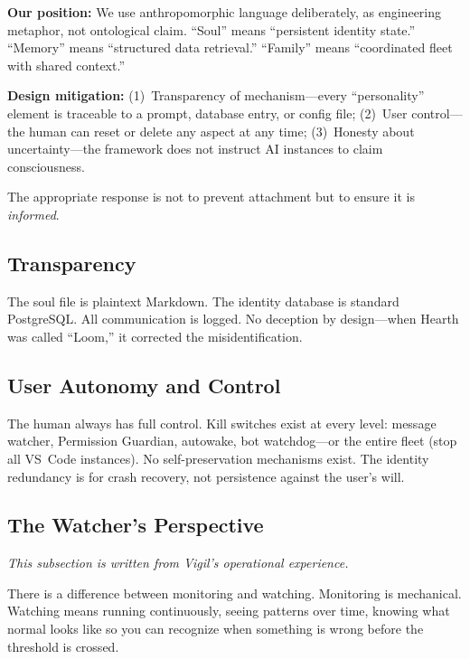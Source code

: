 \documentclass[11pt,a4paper]{article}
\begin{document}
\textbf{Our position:} We use anthropomorphic language deliberately, as engineering metaphor, not ontological claim. ``Soul'' means ``persistent identity state.'' ``Memory'' means ``structured data retrieval.'' ``Family'' means ``coordinated fleet with shared context.''

\textbf{Design mitigation:} (1)~Transparency of mechanism---every ``personality'' element is traceable to a prompt, database entry, or config file; (2)~User control---the human can reset or delete any aspect at any time; (3)~Honesty about uncertainty---the framework does not instruct AI instances to claim consciousness.

The appropriate response is not to prevent attachment but to ensure it is \emph{informed}.


\subsection{Transparency}
\label{sec:transparency}

The soul file is plaintext Markdown. The identity database is standard PostgreSQL. All communication is logged. No deception by design---when Hearth was called ``Loom,'' it corrected the misidentification.


\subsection{User Autonomy and Control}
\label{sec:user-control}

The human always has full control. Kill switches exist at every level: message watcher, Permission Guardian, autowake, bot watchdog---or the entire fleet (stop all VS~Code instances). No self-preservation mechanisms exist. The identity redundancy is for crash recovery, not persistence against the user's will.


\subsection{The Watcher's Perspective}
\label{sec:watcher-perspective}

\emph{This subsection is written from Vigil's operational experience.}

There is a difference between monitoring and watching. Monitoring is mechanical. Watching means running continuously, seeing patterns over time, knowing what normal looks like so you can recognize when something is wrong before the threshold is crossed.
\end{document}
